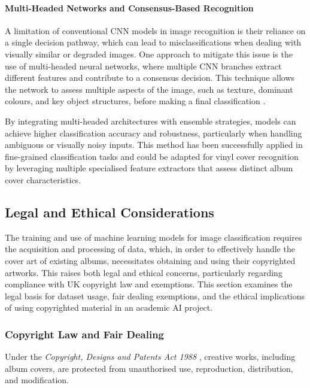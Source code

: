             \paragraph{Multi-Headed Networks and Consensus-Based Recognition}
    
                A limitation of conventional CNN models in image recognition is their reliance on a single decision pathway, which can lead to misclassifications when dealing with visually similar or degraded images. One approach to mitigate this issue is the use of multi-headed neural networks, where multiple CNN branches extract different features and contribute to a consensus decision. This technique allows the network to assess multiple aspects of the image, such as texture, dominant colours, and key object structures, before making a final classification \cite{Zheng2017}. 
            
                By integrating multi-headed architectures with ensemble strategies, models can achieve higher classification accuracy and robustness, particularly when handling ambiguous or visually noisy inputs. This method has been successfully applied in fine-grained classification tasks and could be adapted for vinyl cover recognition by leveraging multiple specialised feature extractors that assess distinct album cover characteristics.
    
        \subsection{Legal and Ethical Considerations}
    
          The training and use of machine learning models for image classification requires the acquisition and processing of data, which, in order to effectively handle the cover art of existing albums, necessitates obtaining and using their copyrighted artworks. This raises both legal and ethical concerns, particularly regarding compliance with UK copyright law and exemptions. This section examines the legal basis for dataset usage, fair dealing exemptions, and the ethical implications of using copyrighted material in an academic AI project.
    
              \subsubsection{Copyright Law and Fair Dealing}
                  Under the \textit{Copyright, Designs and Patents Act 1988} \cite{cdpa1988}, creative works, including album covers, are protected from unauthorised use, reproduction, distribution, and modification.
          

